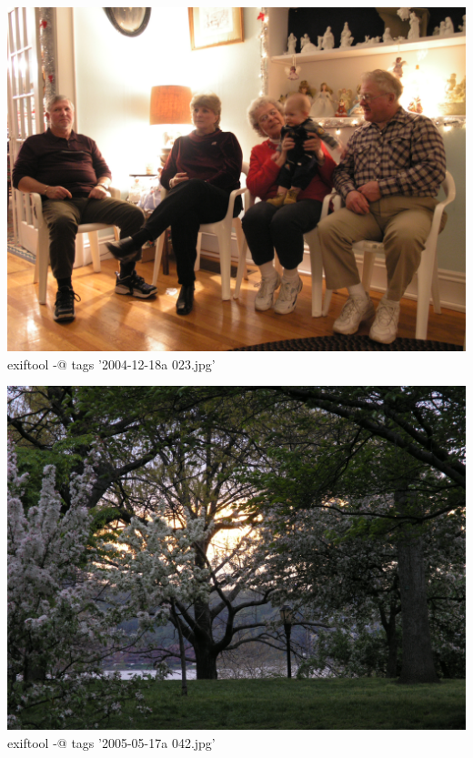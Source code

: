 \documentclass[11pt,chapterprefix=true,pagesize=letter]{scrbook}
\begin{document}
\newpage
\begin{center}
\includegraphics[width=\textwidth]{"2004-12-18a 023"}
\bash[stdout]
exiftool -@ tags '2004-12-18a 023.jpg'
\END
\end{center}

\newpage
\begin{center}
	\includegraphics[width=\textwidth]{"2005-05-17a 042"}
	\bash[stdout]
	exiftool -@ tags '2005-05-17a 042.jpg'
	\END
\end{center}
\end{document}
